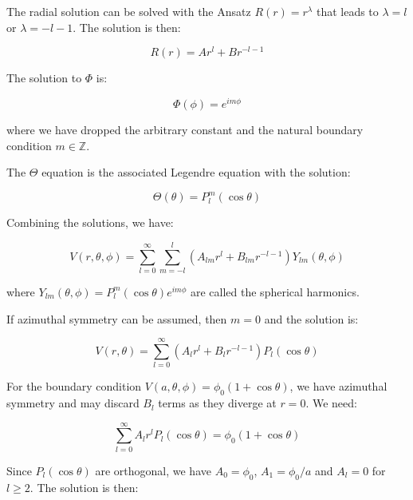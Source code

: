 \documentclass[12pt]{article}
\begin{document}
The radial solution can be solved with the Ansatz $R(r) = r^{\lambda}$ that leads to $\lambda = l$ or $\lambda = -l - 1$. The solution is then:

\begin{equation}
    R(r) = A r^{l} + B r^{-l-1}
\end{equation}

The solution to $\Phi$ is:

\begin{equation}
    \Phi(\phi) = e^{im\phi}
\end{equation}

where we have dropped the arbitrary constant and the natural boundary condition $m \in \mathbb{Z}$.

The $\Theta$ equation is the associated Legendre equation with the solution:

\begin{equation}
    \Theta(\theta) = P_{l}^{m}(\cos{\theta})
\end{equation}

Combining the solutions, we have:

\begin{equation}
    V(r, \theta, \phi) = \sum_{l = 0}^{\infty} \sum_{m = -l}^{l} \left( A_{lm} r^{l} + B_{lm} r^{-l-1} \right) Y_{lm}(\theta, \phi)
\end{equation}

where $Y_{lm}(\theta, \phi) = P_{l}^{m}(\cos{\theta}) e^{im\phi}$ are called the spherical harmonics.

If azimuthal symmetry can be assumed, then $m = 0$ and the solution is:

\begin{equation}
    V(r, \theta) = \sum_{l = 0}^{\infty} \left( A_{l} r^{l} + B_{l} r^{-l-1} \right) P_{l}(\cos{\theta})
\end{equation}

For the boundary condition $V(a, \theta, \phi) = \phi_{0}(1 + \cos{\theta})$, we have azimuthal symmetry and may discard $B_{l}$ terms as they diverge at $r = 0$. We need:

\begin{equation}
    \sum_{l = 0}^{\infty} A_{l} r^{l}  P_{l}(\cos{\theta}) = \phi_{0}(1 + \cos{\theta})
\end{equation}

Since $P_{l}(\cos{\theta})$ are orthogonal, we have $A_{0} = \phi_{0}$, $A_{1} = \phi_{0}/a$ and $A_{l} = 0$ for $l \geq 2$. The solution is then:
\end{document}

